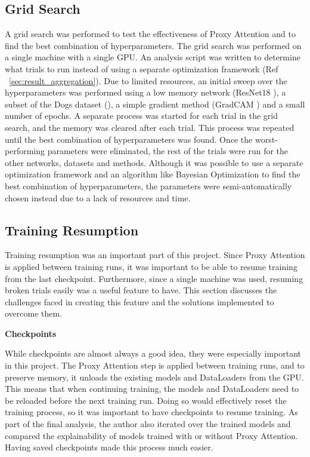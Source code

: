 \subsection{Grid Search}
A grid search was performed to test the effectiveness of Proxy Attention and to find the best combination of hyperparameters. The grid search was performed on a single machine with a single GPU. An analysis script was written to determine what trials to run instead of using a separate optimization framework (Ref ~\ref{sec:result_aggregation}).
Due to limited resources, an initial sweep over the hyperparameters was performed using a low memory network (ResNet18 \cite{heDeepResidualLearning2016}), a subset of the Dogs dataset (\cite{khoslaNovelDatasetFineGrained}), a simple gradient method (GradCAM \cite{selvarajuGradCAMVisualExplanations}) and a small number of epochs. A separate process was started for each trial in the grid search, and the memory was cleared after each trial. This process was repeated until the best combination of hyperparameters was found. Once the worst-performing parameters were eliminated, the rest of the trials were run for the other networks, datasets and methods.
Although it was possible to use a separate optimization framework and an algorithm like Bayesian Optimization to find the best combination of hyperparameters, the parameters were semi-automatically chosen instead due to a lack of resources and time.

\subsection{Training Resumption}
Training resumption was an important part of this project. Since Proxy Attention is applied between training runs, it was important to be able to resume training from the last checkpoint. Furthermore, since a single machine was used, resuming broken trials easily was a useful feature to have. This section discusses the challenges faced in creating this feature and the solutions implemented to overcome them.

\textbf{Checkpoints} \label{sec:checkpoints}

While checkpoints are almost always a good idea, they were especially important in this project. The Proxy Attention step is applied between training runs, and to preserve memory, it unloads the existing models and DataLoaders from the GPU. This means that when continuing training, the models and DataLoaders need to be reloaded before the next training run. Doing so would effectively reset the training process, so it was important to have checkpoints to resume training.
As part of the final analysis, the author also iterated over the trained models and compared the explainability of models trained with or without Proxy Attention. Having saved checkpoints made this process much easier.

